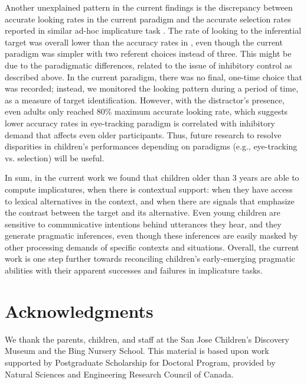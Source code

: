 \documentclass[10pt,letterpaper]{article}
\begin{document}
Another unexplained pattern in the current findings is the discrepancy between accurate looking rates in the current paradigm and the accurate selection rates reported in similar ad-hoc implicature task \cite{stillerLLD}. The rate of looking to the inferential target was overall lower than the accuracy rates in , even though the current paradigm was simpler with two referent choices instead of three. This might be due to the paradigmatic differences, related to the issue of inhibitory control as described above. In the current paradigm, there was no final, one-time choice that was recorded; instead, we monitored the looking pattern during a period of time, as a measure of target identification. However, with the distractor's presence, even adults only reached 80\% maximum accurate looking rate, which suggests lower accuracy rates in eye-tracking paradigm is correlated with inhibitory demand that affects even older participants. Thus, future research to resolve disparities in children's performances depending on paradigms (e.g., eye-tracking vs. selection) will be useful.

In sum, in the current work we found that children older than 3 years are able to compute implicatures, when there is contextual support: when they have access to lexical alternatives in the context, and when there are signals that emphasize the contrast between the target and its alternative. Even young children are sensitive to communicative intentions behind utterances they hear, and they generate pragmatic inferences, even though these inferences are easily masked by other processing demands of specific contexts and situations. Overall, the current work is one step further towards reconciling children's early-emerging pragmatic abilities with their apparent successes and failures in implicature tasks.

\section{Acknowledgments}

We thank the parents, children, and staff at the San Jose Children's Discovery Museum and the Bing Nursery School. This material is based upon work supported by Postgraduate Scholarship for Doctoral Program, provided by Natural Sciences and Engineering Research Council of Canada.



\setlength{\bibleftmargin}{.125in}
\setlength{\bibindent}{-\bibleftmargin}


\end{document}
